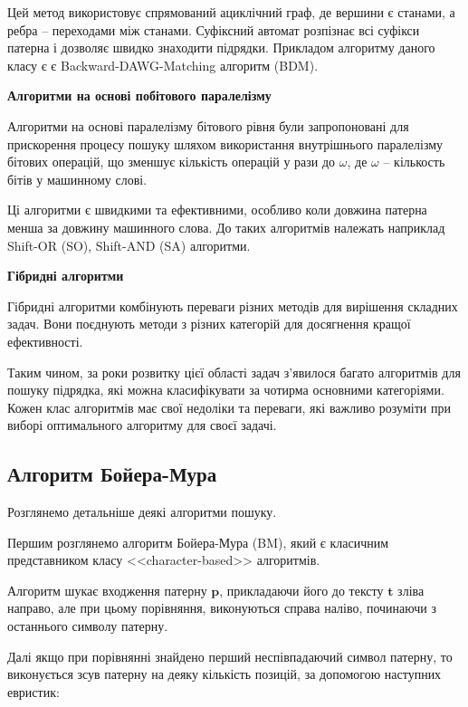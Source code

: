 \documentclass[a4paper,14pt]{extarticle} %
\begin{document}
Цей метод використовує спрямований ациклічний граф, де вершини є станами, а ребра – переходами між станами. Суфіксний автомат розпізнає всі суфікси патерна і дозволяє швидко знаходити підрядки.
Прикладом алгоритму даного класу є є Backward-DAWG-Matching алгоритм (BDM).

\textbf{Алгоритми на основі побітового паралелізму}

Алгоритми на основі паралелізму бітового рівня були запропоновані для прискорення процесу пошуку шляхом використання внутрішнього паралелізму бітових операцій, що зменшує кількість операцій у рази до $\omega$, де $\omega$ –  кількость бітів у машинному слові.

Ці алгоритми є швидкими та ефективними, особливо коли довжина патерна менша за довжину машинного слова. До таких алгоритмів належать наприклад Shift-OR (SO), Shift-AND (SA) алгоритми.

\textbf{Гібридні алгоритми}

Гібридні алгоритми комбінують переваги різних методів для вирішення складних задач. Вони поєднують методи з різних категорій для досягнення кращої ефективності.

Таким чином, за роки розвитку цієї області задач з'явилося багато алгоритмів для пошуку підрядка, які можна класифікувати за чотирма основними категоріями. Кожен клас алгоритмів має свої недоліки та переваги, які важливо розуміти при виборі оптимального алгоритму для своєї задачі.

\subsection{Алгоритм Бойера-Мура}
Розглянемо детальніше деякі алгоритми пошуку.

Першим розглянемо алгоритм Бойера-Мура (BM), який є класичним представником класу <<character-based>> алгоритмів.

Алгоритм шукає входження патерну $\textbf{p}$, прикладаючи його до тексту $\textbf{t}$ зліва направо, але при цьому порівняння, виконуються справа наліво, починаючи з останнього символу патерну.

Далі якщо при порівнянні знайдено перший неспівпадаючий символ патерну, то виконується зсув патерну на деяку кількість позицій, за допомогою наступних евристик:
\end{document}
